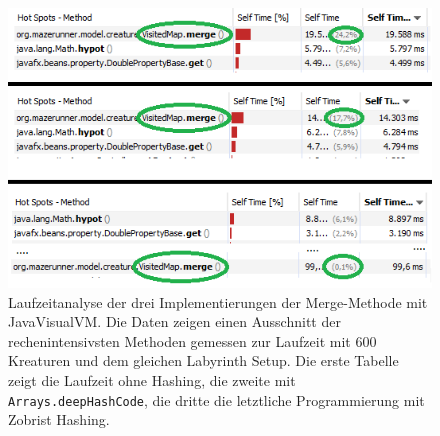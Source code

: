 \begin{figure}[htb]
	\centering
	\includegraphics[width=0.8\linewidth]{images/benchmark.png}
	\caption{Laufzeitanalyse der drei Implementierungen der Merge-Methode mit JavaVisualVM. Die Daten zeigen einen Ausschnitt der rechenintensivsten Methoden gemessen zur Laufzeit mit 600 Kreaturen und dem gleichen Labyrinth Setup. Die erste Tabelle zeigt die Laufzeit ohne Hashing, die zweite mit \lstinline{Arrays.deepHashCode}, die dritte die letztliche Programmierung mit Zobrist Hashing.}
	\label{fig:benchmark}
\end{figure}

